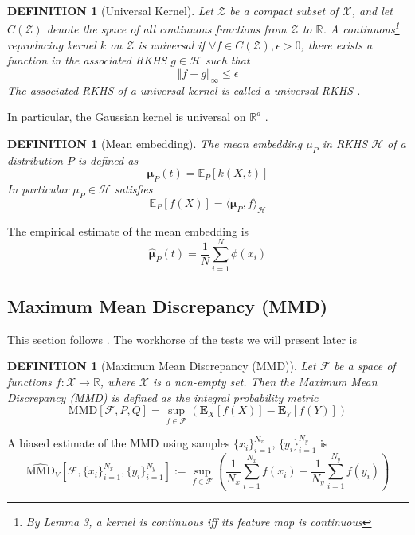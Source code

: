 \documentclass[a4paper,11pt]{article}
\newtheorem{definition}[theorem]{DEFINITION}
\newcommand{\E}{\mathbb{E}}
\begin{document}
\begin{definition}[Universal Kernel]
Let $\mathcal{Z}$ be a compact subset of $\mathcal{X}$, and let $C(\mathcal{Z})$ denote the space of all continuous functions from $\mathcal{Z}$ to $\mathbb{R}$. A continuous\footnote{By \cite{steinwart_uence_2001} Lemma 3, a kernel is continuous iff its feature map is continuous} reproducing kernel $k$ on $\mathcal{Z}$ is universal if $\forall f \in C(\mathcal{Z}), \epsilon>0$, there exists a function in the associated RKHS $g \in \mathcal{H}$ such that 
$$ \Vert f-g \Vert_{\infty} \leq \epsilon $$
The associated RKHS of a universal kernel is called a universal RKHS \cite{steinwart_uence_2001}.
\end{definition}
In particular, the Gaussian kernel is universal on $\mathbb{R}^{d}$ \cite{steinwart_uence_2001}.

\begin{definition}[Mean embedding]
The mean embedding $\mu_{P}$ in RKHS $\mathcal{H}$ of a distribution $P$ is defined as 
    \begin{equation}
        \mathbf{\mu}_{P}(t) = \E_{P}[k(X, t)]
    \end{equation}    
    In particular $\mu_{P} \in \mathcal{H}$ satisfies
    \begin{equation}
        \E_{P}[f(X)] = \langle \mathbf{\mu}_{P}, f \rangle_{\mathcal{H}}
    \end{equation}
\end{definition}
The empirical estimate of the mean embedding is 
\begin{equation}
    \hat{\mathbf{\mu}}_{P}(t) = \frac{1}{N}\sum_{i=1}^{N}\phi(x_{i})
\end{equation}

\subsection{Maximum Mean Discrepancy (MMD)}
This section follows \cite{gretton_kernel_2012}. The workhorse of the tests we will present later is 
\begin{definition}[Maximum Mean Discrepancy (MMD)]
Let $\mathcal{F}$ be a space of functions $f:\mathcal{X}\rightarrow \mathbb{R}$, where $\mathcal{X}$ is a non-empty set. Then the Maximum Mean Discrepancy (MMD) is defined as the integral probability metric
    \begin{equation}
        \mathrm{MMD}[\mathcal{F}, P, Q]=\sup _{f \in \mathcal{F}}\left(\mathbf{E}_{X}[f(X)]-\mathbf{E}_{Y}[f(Y)]\right)
    \label{eq:mmd}
    \end{equation}
\end{definition}
A biased estimate of the MMD using samples $\{x_{i}\}_{i=1}^{N_{x}}$, $\{y_{i}\}_{i=1}^{N_{y}}$ is
\begin{equation}
    \widehat{\mathrm{MMD}}_{V}[\mathcal{F}, \{x_{i}\}_{i=1}^{N_{x}}, \{y_{i}\}_{i=1}^{N_{y}}]:=\sup _{f \in \mathcal{F}}\left(\frac{1}{N_{x}}\sum_{i=1}^{N_{x}}f(x_{i})-\frac{1}{N_{y}}\sum_{i=1}^{N_{y}}f(y_{i})\right)
\end{equation}
\end{document}
